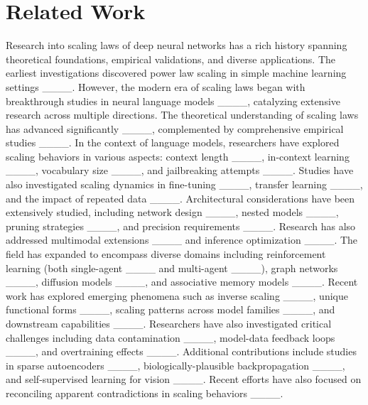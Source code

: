 \section{Related Work}
\label{sec:related_work}

Research into scaling laws of deep neural networks has a rich history spanning theoretical foundations, empirical validations, and diverse applications. The earliest investigations discovered power law scaling in simple machine learning settings ____. However, the modern era of scaling laws began with breakthrough studies in neural language models ____, catalyzing extensive research across multiple directions.
The theoretical understanding of scaling laws has advanced significantly ____, complemented by comprehensive empirical studies ____.
In the context of language models, researchers have explored scaling behaviors in various aspects: context length ____, in-context learning ____, vocabulary size ____, and jailbreaking attempts ____. Studies have also investigated scaling dynamics in fine-tuning ____, transfer learning ____, and the impact of repeated data ____.
Architectural considerations have been extensively studied, including network design ____, nested models ____, pruning strategies ____, and precision requirements ____. Research has also addressed multimodal extensions ____ and inference optimization ____.
The field has expanded to encompass diverse domains including reinforcement learning (both single-agent ____ and multi-agent ____), graph networks ____, diffusion models ____, and associative memory models ____.
Recent work has explored emerging phenomena such as inverse scaling ____, unique functional forms ____, scaling patterns across model families ____, and downstream capabilities ____. Researchers have also investigated critical challenges including data contamination ____, model-data feedback loops ____, and overtraining effects ____. Additional contributions include studies in sparse autoencoders ____, biologically-plausible backpropagation ____, and self-supervised learning for vision ____.
Recent efforts have also focused on reconciling apparent contradictions in scaling behaviors ____.
